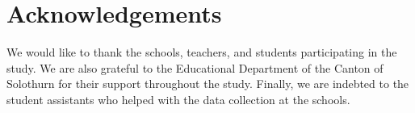 \documentclass[fleqn,11pt]{wlscirep}
\begin{document}
\newpage


\section*{Acknowledgements}
We would like to thank the schools, teachers, and students participating in the study. We are also grateful to the Educational Department of the Canton of Solothurn for their support throughout the study. Finally, we are indebted to the student assistants who helped with the data collection at the schools.


\end{document}
